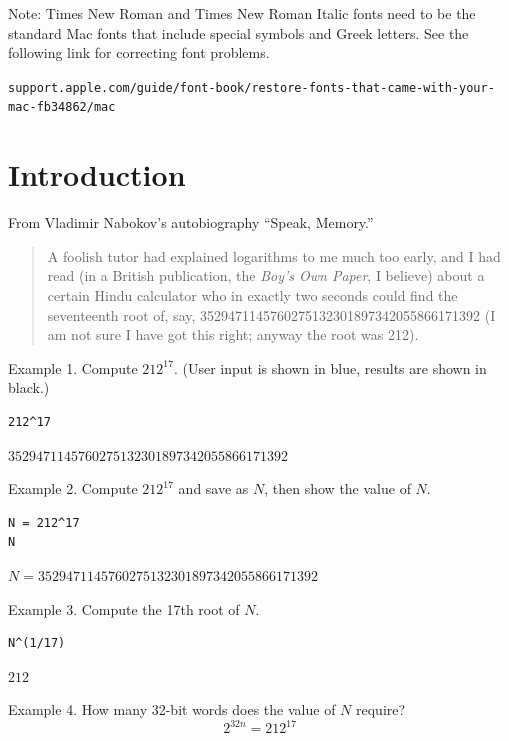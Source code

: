 \documentclass[12pt]{article}
\begin{document}

\bigskip
Note: Times New Roman and Times New Roman Italic fonts need
to be the standard Mac fonts that include special symbols and Greek letters.
See the following link for correcting font problems.

\bigskip
{\footnotesize\verb$support.apple.com/guide/font-book/restore-fonts-that-came-with-your-mac-fb34862/mac$}

\newpage
\tableofcontents

\newpage

\section{Introduction}

From Vladimir Nabokov's autobiography ``Speak, Memory.''
\begin{quote}
A foolish tutor had explained logarithms to me much too early, and I had
read (in a British publication, the {\it Boy's Own Paper}, I believe)
about a certain Hindu calculator who in exactly two seconds could find the
seventeenth root of, say,
3529471145760275132301897342055866171392
(I am not sure I have got this right; anyway the root was 212).
\end{quote}

Example 1. Compute $212^{17}$.
(User input is shown in blue, results are shown in black.)

{\color{blue}
\begin{verbatim}
212^17
\end{verbatim}}

$3529471145760275132301897342055866171392$

\bigskip
Example 2. Compute $212^{17}$ and save as $N$,
then show the value of $N$.

{\color{blue}
\begin{verbatim}
N = 212^17
N
\end{verbatim}}

$N=3529471145760275132301897342055866171392$

\bigskip
Example 3. Compute the 17th root of $N$.

{\color{blue}
\begin{verbatim}
N^(1/17)
\end{verbatim}}

$212$

\bigskip
Example 4. How many 32-bit words does the value of $N$ require?
\begin{equation*}
2^{32n}=212^{17}
\end{equation*}
\end{document}
